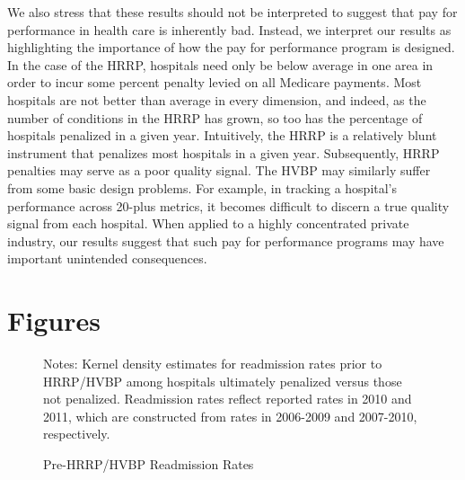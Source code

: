 \documentclass[12pt]{article}
\begin{document}
We also stress that these results should not be interpreted to suggest that pay for performance in health care is inherently bad. Instead, we interpret our results as highlighting the importance of how the pay for performance program is designed. In the case of the HRRP, hospitals need only be below average in one area in order to incur some percent penalty levied on all Medicare payments. Most hospitals are not better than average in every dimension, and indeed, as the number of conditions in the HRRP has grown, so too has the percentage of hospitals penalized in a given year. Intuitively, the HRRP is a relatively blunt instrument that penalizes most hospitals in a given year. Subsequently, HRRP penalties may serve as a poor quality signal. The HVBP may similarly suffer from some basic design problems. For example, in tracking a hospital's performance across 20-plus metrics, it becomes difficult to discern a true quality signal from each hospital. When applied to a highly concentrated private industry, our results suggest that such pay for performance programs may have important unintended consequences.

\newpage




\clearpage
\newpage


\newsavebox{\gfxbox}
\newpage
\section*{Figures}
\setlength{\captionmargin}{.5 \textwidth} \addtolength{\captionmargin}{-.5\wd\gfxbox}
\begin{figure}[htbp!]
\centering
\caption{Pre-HRRP/HVBP Readmission Rates}
\label{fig:pre_readmits}
\usebox{\gfxbox}
\par
\begin{minipage}{\wd\gfxbox}
\footnotesize
Notes:  Kernel density estimates for readmission rates prior to HRRP/HVBP among hospitals ultimately penalized versus those not penalized. Readmission rates reflect reported rates in 2010 and 2011, which are constructed from rates in 2006-2009 and 2007-2010, respectively.
\end{minipage}
\end{figure}
\newpage
\end{document}
